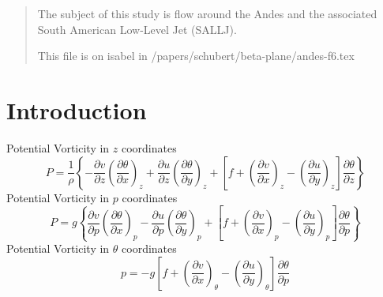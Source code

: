 \documentclass{article}
\begin{document}

\begin{abstract} 

     The subject of this study is flow around the Andes and the associated South American 
     Low-Level Jet (SALLJ).  
 
This file is on isabel in /papers/schubert/beta-plane/andes-f6.tex

\end{abstract}


\section{Introduction}

Potential Vorticity in $z$ coordinates
\begin{equation}
P = \frac{1}{\rho}\left\{-\frac{\partial v}{\partial z}\left(\frac{\partial \theta}{\partial x}\right)_z+
       \frac{\partial u}{\partial z}\left(\frac{\partial\theta}{\partial y}\right)_z+
       \left[f+\left(\frac{\partial v}{\partial x}\right)_z-\left(\frac{\partial u}{\partial y}\right)_z\right]
       \frac{\partial\theta}{\partial z}
       \right\}
\end{equation}
Potential Vorticity in $p$ coordinates
\begin{equation}
P = g\left\{\frac{\partial v}{\partial p}\left(\frac{\partial \theta}{\partial x}\right)_p-
       \frac{\partial u}{\partial p}\left(\frac{\partial\theta}{\partial y}\right)_p+
       \left[f+\left(\frac{\partial v}{\partial x}\right)_p-\left(\frac{\partial u}{\partial y}\right)_p\right]
       \frac{\partial\theta}{\partial p}
       \right\}
\end{equation}
Potential Vorticity in $\theta$ coordinates
\begin{equation}
p = -g\left[f+\left(\frac{\partial v}{\partial x}\right)_{\theta}-\left(\frac{\partial u}{\partial y}\right)_{\theta}\right]\frac{\partial\theta}{\partial p}
\end{equation}
\end{document}
